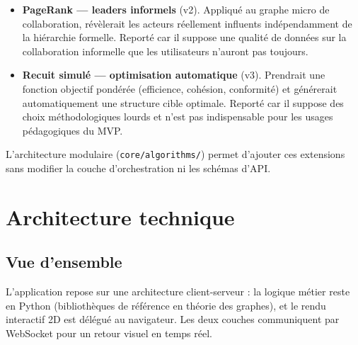 \documentclass[11pt,a4paper]{article}
\begin{document}
\begin{itemize}[leftmargin=*]
    \item \textbf{PageRank --- leaders informels} (v2). Appliqué au graphe micro de collaboration, révèlerait les acteurs réellement influents indépendamment de la hiérarchie formelle. Reporté car il suppose une qualité de données sur la collaboration informelle que les utilisateurs n'auront pas toujours.
    \item \textbf{Recuit simulé --- optimisation automatique} (v3). Prendrait une fonction objectif pondérée (efficience, cohésion, conformité) et générerait automatiquement une structure cible optimale. Reporté car il suppose des choix méthodologiques lourds et n'est pas indispensable pour les usages pédagogiques du MVP.
\end{itemize}

L'architecture modulaire (\texttt{core/algorithms/}) permet d'ajouter ces extensions sans modifier la couche d'orchestration ni les schémas d'API.

\section{Architecture technique}

\subsection{Vue d'ensemble}

L'application repose sur une architecture client-serveur : la logique métier reste en Python (bibliothèques de référence en théorie des graphes), et le rendu interactif 2D est délégué au navigateur. Les deux couches communiquent par WebSocket pour un retour visuel en temps réel.
\end{document}
